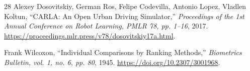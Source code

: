 \documentclass[journal]{IEEEtran}
\begin{document}
\begin{thebibliography}{28}
Alexey Dosovitskiy, German Ros, Felipe Codevilla, Antonio Lopez, Vladlen Koltun, ``CARLA: An Open Urban Driving Simulator,'' \emph{Proceedings of the 1st Annual Conference on Robot Learning, PMLR 78, pp. 1--16}, 2017.
\url{https://proceedings.mlr.press/v78/dosovitskiy17a.html}.

Frank Wilcoxon, ``Individual Comparisons by Ranking Methods,'' \emph{Biometrics Bulletin, vol. 1, no. 6, pp. 80}, 1945.
\url{https://doi.org/10.2307/3001968}.

\end{thebibliography}
\end{document}
